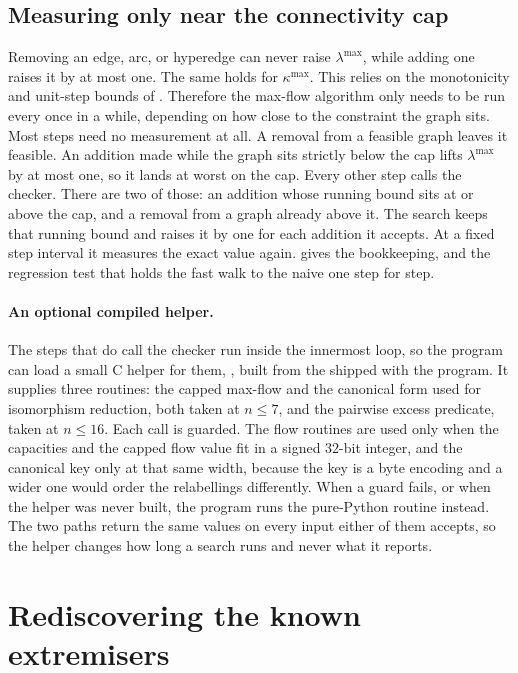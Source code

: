 \subsection{Measuring only near the connectivity cap}
Removing an edge, arc, or hyperedge can never raise $\lambda^{\max}$, while adding one raises it by at most one.
The same holds for $\kappa^{\max}$.
This relies on the monotonicity and unit-step bounds of .
Therefore the max-flow algorithm only needs to be run every once in a while,
depending on how close to the constraint the graph sits.
Most steps need no measurement at all.
A removal from a feasible graph leaves it feasible.
An addition made while the graph sits strictly below the cap lifts
$\lambda^{\max}$ by at most one, so it lands at worst on the cap.
Every other step calls the checker.
There are two of those: an addition whose running bound sits at or above
the cap, and a removal from a graph already above it.
The search keeps that running bound and raises it by one for each addition
it accepts.
At a fixed step interval it measures the exact value again.
 gives the bookkeeping,
and the regression test that holds the fast walk to the naive one step for step.

\paragraph{An optional compiled helper.}
The steps that do call the checker run inside the innermost loop, so the
program can load a small C helper for them, , built from
the  shipped with the program. It supplies three routines:
the capped max-flow and the canonical form used for isomorphism reduction, both
taken at $n\le7$, and the pairwise excess predicate, taken at $n\le16$. Each
call is guarded. The flow routines are used only when the capacities and the
capped flow value fit in a signed $32$-bit integer, and the canonical key only
at that same width, because the key is a byte encoding and a wider one would
order the relabellings differently. When a guard fails, or when the helper was
never built, the program runs the pure-Python routine instead. The two paths
return the same values on every input either of them accepts, so the helper
changes how long a search runs and never what it reports.

\section{Rediscovering the known extremisers}\label{sec:rediscovery}

